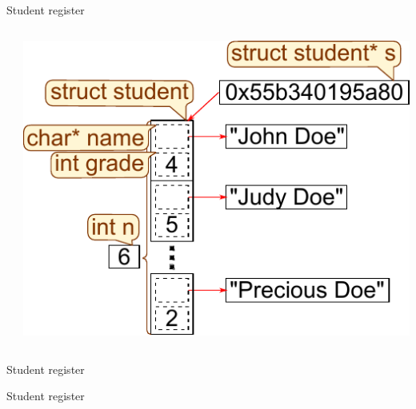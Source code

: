 \documentclass[usenames,dvipsnames,aspectratio=169]{beamer}
\begin{document}
\begin{frame}{Student register}
  \begin{columns}[T]
      \footnotesize
      \begin{exampleblock}{}
        
        
      \end{exampleblock}
      \begin{center}
        \includegraphics[width=\textwidth]{students1.pdf}
      \end{center}
  \end{columns}
\end{frame}

\begin{frame}{Student register}
  \scriptsize
  \begin{exampleblock}{}
    \vspace{-.3cm}
    
    \vspace{-.3cm}
  \end{exampleblock}
\end{frame}

\begin{frame}{Student register}
  \begin{exampleblock}{}
    
  \end{exampleblock}
\end{frame}
\end{document}
